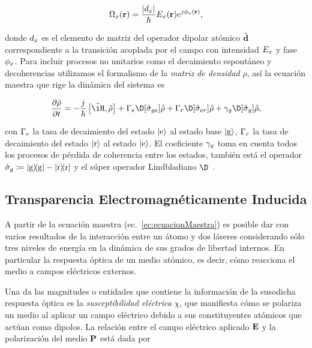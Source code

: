 \begin{equation}
\label{ec:frecuenciasRabi}
\Omega_{x}(\text{\textbf{r}})=\dfrac{\left|d_{x}\right|}{\hbar}E_{x}(\text{\textbf{r}})e^{j\phi_{x}(\text{\textbf{r}})},
\end{equation}

donde $d_{x}$ es el elemento de matriz del operador dipolar atómico $\hat{\text{\textbf{d}}}$ correspondiente a la transición acoplada por el campo con intensidad $E_{x}$ y fase $\phi_{x}$. Para incluir procesos no unitarios como el decaimiento espontáneo y decoherencias utilizamos el formalismo de la \emph{matriz de densidad} $\rho$, así la ecuación maestra que rige la dinámica del sistema es

\begin{equation}
\label{ec:ecuacionMaestra}
\dfrac{\partial\tilde{\rho}}{\partial t}=-\dfrac{j}{\hbar}\left[\tilde{\iH},\tilde{\rho}\right]+\Gamma_\sm{e}\D[\hat{\sigma}_\sm{ge}]\hat{\rho}+\Gamma_\sm{r}\D[\hat{\sigma}_\sm{er}]\hat{\rho}+\gamma_\sm{g}\D[\hat{\sigma}_\sm{g}]\hat{\rho},
\end{equation}

con $\Gamma_{e}$ la tasa de decaimiento del estado $\ket{e}$ al estado base $\ket{g}$, $\Gamma_{r}$ la tasa de decaimiento del estado $\ket{r}$ al estado $\ket{e}$. El coeficiente $\gamma_{g}$ toma en cuenta todos los procesos de pérdida de coherencia entre los estados, también está el operador $\hat{\sigma}_\sm{g}\coloneqq\ketbra{g}{g}-\ketbra{r}{r}$ y el súper operador Lindbladiano $\D$~\cite{breuer}.

\subsection{\label{sub:eit}Transparencia Electromagnéticamente Inducida}

A partir de la ecuación maestra (ec.~\ref{ec:ecuacionMaestra}) es posible dar con varios resultados de la interacción entre un átomo y dos láseres considerando sólo tres niveles de energía en la dinámica de sus grados de libertad internos. En particular la respuesta óptica de un medio atómico, es decir, cómo reacciona el medio a campos eléctricos externos.

\p Una da las magnitudes o entidades que contiene la información de la susodicha respuesta óptica es la \emph{susceptibilidad eléctrica} $\chi$, que manifiesta cómo se polariza un medio al aplicar un campo eléctrico debido a sus constituyentes atómicos que actúan como dipolos. La relación entre el campo eléctrico aplicado $ \text{\textbf{E}}$ y la polarización del medio $\text{\textbf{P}}$ está dada por


